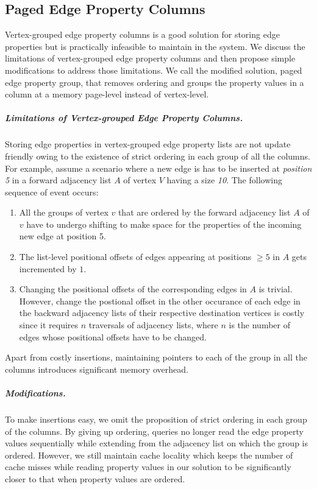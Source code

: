 \subsection{Paged Edge Property Columns}
\label{sec:page-level-edge-property-columns}

Vertex-grouped edge property columns is a good solution for storing edge properties but is practically infeasible to maintain in the system. We discuss the limitations of vertex-grouped edge property columns and then propose simple modifications to address those limitations. We call the modified solution, paged edge property group, that removes ordering and groups the property values in a column at a memory page-level instead of vertex-level.

\vspace{-12pt}
\subparagraph{Limitations of Vertex-grouped Edge Property Columns.}
Storing edge properties in vertex-grouped edge property lists are not update friendly owing to the existence of strict ordering in each group of all the columns. For example, assume a scenario where a new edge is has to be inserted at \emph{position 5} in a forward adjacency list $A$ of vertex $V$ having a size \emph{10}. The following sequence of event occurs: 
\begin{enumerate}
	\item All the groups of vertex $v$ that are ordered by the forward adjacency list $A$ of $v$ have to undergo shifting to make space for the properties of the incoming new edge at position 5.
	\item The list-level positional offsets of edges appearing at positions $\geq 5$ in $A$ gets incremented by $1$. 
	\item Changing the positional offsets of the corresponding edges in $A$ is trivial. However, change the postional offset in the other occurance of each edge in the backward adjacency lists of their respective destination vertices is costly since it requires $n$ traversals of adjacency lists, where $n$ is the number of edges whose positional offsets have to be changed.
\end{enumerate}

Apart from costly insertions, maintaining pointers to each of the group in all the columns introduces significant memory overhead. 

\vspace{-16pt}
\subparagraph{Modifications.}
To make insertions easy, we omit the proposition of strict ordering in each group of the columns. By giving up ordering, queries no longer read the edge property values sequentially while extending from the adjacency list on which the group is ordered. However, we still maintain cache locality which keeps the number of cache misses while reading property values in our solution to be significantly closer to that when property values are ordered.

